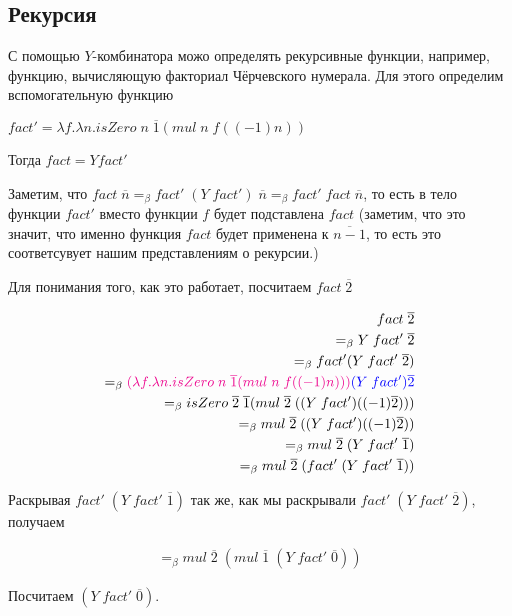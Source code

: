 \subsection{Рекурсия}

С помощью $Y$-комбинатора можо определять рекурсивные функции, например, функцию, вычисляющую факториал Чёрчевского нумерала. Для этого определим вспомогательную функцию

$fact' = \lambda f. \lambda n. isZero\; n \; \overline{1} (mul \; n \; f((-1) n))$

Тогда $fact = Y fact'$

Заметим, что $fact \; \overline{n} =_{\beta} fact' \; (Y \; fact') \; \overline{n} =_{\beta}fact' \; fact \; \overline{n} $, то есть в тело функции $fact'$ вместо функции $f$ будет подставлена $fact$ (заметим, что это значит, что именно функция $fact$ будет применена к $\overline{n - 1}$, то есть это соответсувует нашим представлениям о рекурсии.)

Для понимания того, как это работает, посчитаем $fact \; \overline{2}$

\begin{align*}
	fact \; \overline{2} \\ =_{\beta} Y \; fact' \; \overline{2}\\ =_{\beta} fact' (Y \; fact' \; \overline{2}) \\=_{\beta}\textcolor{magenta}{(\lambda f. \lambda n. isZero\; n \; \overline{1} (mul \; n \; f((-1) n)))} \textcolor{blue}{(Y \; fact') \overline{2}} \\
	=_{\beta}isZero\; \overline{2} \; \overline{1} (mul \; \overline{2} \; ((Y \; fact')((-1) \overline{2}))) \\ =_{\beta} mul \; \overline{2} \; ((Y \; fact')((-1) \overline{2})) \\ =_{\beta} mul \; \overline{2} \; (Y \; fact' \; \overline{1}) \\ =_{\beta} mul \; \overline{2} \; (fact' \;(Y \; fact' \; \overline{1}))
\end{align*}

Раскрывая $fact' \;(Y \; fact' \; \overline{1})$ так же, как мы раскрывали  $fact' \;(Y \; fact' \; \overline{2})$, получаем

\begin{align*}
	=_{\beta} mul \; \overline{2} \; (mul \; \overline{1} \; (Y \; fact' \; \overline{0}))
\end{align*}

Посчитаем $(Y \; fact' \; \overline{0})$.

